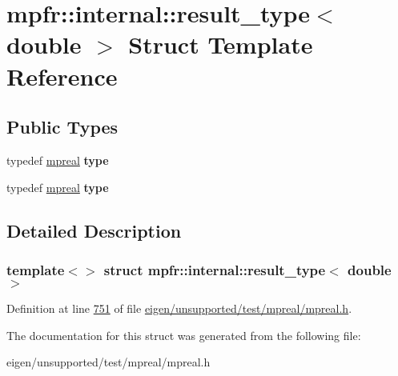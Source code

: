 \hypertarget{structmpfr_1_1internal_1_1result__type_3_01double_01_4}{}\section{mpfr\+:\+:internal\+:\+:result\+\_\+type$<$ double $>$ Struct Template Reference}
\label{structmpfr_1_1internal_1_1result__type_3_01double_01_4}
\subsection*{Public Types}
\begin{DoxyCompactItemize}
\item 
\mbox{\label{structmpfr_1_1internal_1_1result__type_3_01double_01_4_a92a6d09db86c0989d04fb4abd2ad709f}} 
typedef \hyperlink{classmpfr_1_1mpreal}{mpreal} {\bfseries type}
\item 
\mbox{\label{structmpfr_1_1internal_1_1result__type_3_01double_01_4_a92a6d09db86c0989d04fb4abd2ad709f}} 
typedef \hyperlink{classmpfr_1_1mpreal}{mpreal} {\bfseries type}
\end{DoxyCompactItemize}


\subsection{Detailed Description}
\subsubsection*{template$<$$>$\newline
struct mpfr\+::internal\+::result\+\_\+type$<$ double $>$}



Definition at line \hyperlink{eigen_2unsupported_2test_2mpreal_2mpreal_8h_source_l00751}{751} of file \hyperlink{eigen_2unsupported_2test_2mpreal_2mpreal_8h_source}{eigen/unsupported/test/mpreal/mpreal.\+h}.



The documentation for this struct was generated from the following file\+:\begin{DoxyCompactItemize}
\item 
eigen/unsupported/test/mpreal/mpreal.\+h\end{DoxyCompactItemize}
